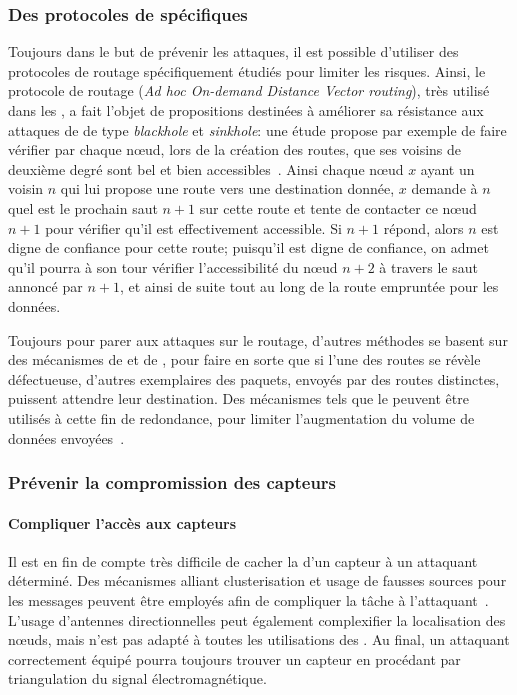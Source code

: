     \subsubsection{Des protocoles de  spécifiques}
Toujours dans le but de prévenir les attaques, il est possible d'utiliser des protocoles de routage spécifiquement étudiés pour limiter les risques.
Ainsi, le protocole de routage \aodv (\textit{Ad hoc On-demand Distance Vector routing}), très utilisé dans les \rcs, a fait l'objet de propositions destinées à améliorer sa résistance aux attaques de \dds de type \textit{blackhole} et \textit{sinkhole}: une étude propose par exemple de faire vérifier par chaque nœud, lors de la création des routes, que ses voisins de deuxième degré sont bel et bien accessibles~\cite{DLA02}.
Ainsi chaque nœud $x$ ayant un voisin $n$ qui lui propose une route vers une destination donnée, $x$ demande à $n$ quel est le prochain saut $n+1$ sur cette route et tente de contacter ce nœud $n+1$ pour vérifier qu'il est effectivement accessible.
Si $n+1$ répond, alors $n$ est digne de confiance pour cette route; puisqu'il est digne de confiance, on admet qu'il pourra à son tour vérifier l'accessibilité du nœud $n+2$ à travers le saut annoncé par $n+1$, et ainsi de suite tout au long de la route empruntée pour les données.

Toujours pour parer aux attaques sur le routage, d'autres méthodes se basent sur des mécanismes de  et de \resilience, pour faire en sorte que si l'une des routes se révèle défectueuse, d'autres exemplaires des paquets, envoyés par des routes distinctes, puissent attendre leur destination.
Des mécanismes tels que le  peuvent être utilisés à cette fin de redondance, pour limiter l'augmentation du volume de données envoyées~\cite{MMB13}.

    \subsubsection{Prévenir la compromission des capteurs}
        \paragraph{Compliquer l'accès aux capteurs}
Il est en fin de compte très difficile de cacher la  d'un capteur à un attaquant déterminé.
Des mécanismes alliant clusterisation et usage de fausses sources pour les messages peuvent être employés afin de compliquer la tâche à l'attaquant~\cite{GK13}.
L'usage d'antennes directionnelles peut également complexifier la localisation des nœuds, mais n'est pas adapté à toutes les utilisations des \rcs.
Au final, un attaquant correctement équipé pourra toujours trouver un capteur en procédant par triangulation du signal électromagnétique.

